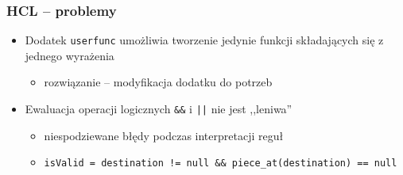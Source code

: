 \documentclass{beamer}
\begin{document}
\begin{frame}[noframenumbering]
	\frametitle{HCL -- problemy}
	\begin{itemize}
		\item Dodatek {\tt userfunc} umożliwia tworzenie jedynie funkcji składających się z jednego wyrażenia
		      \begin{itemize}
			      \item rozwiązanie -- modyfikacja dodatku do potrzeb
		      \end{itemize}
		\item Ewaluacja operacji logicznych {\tt \&\&} i {\tt ||} nie jest ,,leniwa''
		      \begin{itemize}
			      \item niespodziewane błędy podczas interpretacji reguł
			      \item \lstinline|isValid = destination != null && piece_at(destination) == null|
		      \end{itemize}
	\end{itemize}
\end{frame}
\end{document}

